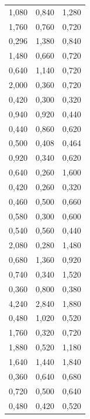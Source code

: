 {\begin{figure}[htbp]
\begin{tabular}{c|c|c}
                                1,080 & 0,840 & 1,280\\
                                1,760 &	0,760 & 0,720\\
                                0,296 & 1,380 & 0,840\\
                                1,480 & 0,660 & 0,720\\
                                0,640 & 1,140 & 0,720\\
                                2,000 & 0,360 & 0,720\\
                                0,420 & 0,300 & 0,320\\
                                0,940 & 0,920 & 0,440\\
                                0,440 & 0,860 & 0,620\\
                                0,500 & 0,408 & 0,464\\
                                0,920 & 0,340 & 0,620\\
                                0,640 & 0,260 & 1,600\\
                                0,420 & 0,260 & 0,320\\
                                0,460 & 0,500 & 0,660\\
                                0,580 & 0,300 & 0,600\\
                                0,540 & 0,560 & 0,440\\
                                2,080 & 0,280 & 1,480\\
                                0,680 & 1,360 & 0,920\\
                                0,740 & 0,340 & 1,520\\
                                0,360 & 0,800 & 0,380\\
                                4,240 & 2,840 & 1,880\\
                                0,480 & 1,020 & 0,520\\
                                1,760 & 0,320 & 0,720\\
                                1,880 & 0,520 & 1,180\\
                                1,640 & 1,440 & 1,840\\
                                0,360 & 0,640 & 0,680\\
                                0,720 & 0,500 & 0,640\\
                                0,480 & 0,420 & 0,520\\

\end{tabular}
\end{figure}}
